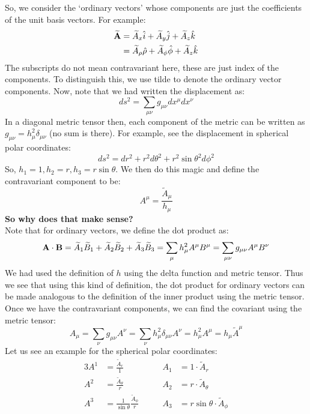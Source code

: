 So, we consider the `ordinary vectors' whose components are just the coefficients of the unit basis vectors. For example:
\begin{align*}
    \widetilde{\boldsymbol{\mathbf{A}}} &= \widetilde{A}_x \hat{i}+\widetilde{A}_y \hat{j}+\widetilde{A}_z \hat{k}\\
    &=\widetilde{A}_\rho \hat{\rho}+\widetilde{A}_\phi \hat{\phi}+\widetilde{A}_z \hat{k}
\end{align*}
The subscripts do not mean contravariant here, these are just index of the components. To distinguish this, we use tilde to denote the ordinary vector components. Now, note that we had written the displacement as:
$$ds^2 = \sum\limits_{\mu\nu} g_{\mu\nu}dx^\mu dx^\nu$$
In a diagonal metric tensor then, each component of the metric can be written as $g_{\mu\nu} = h_\mu^2\delta_{\mu\nu}$ (no sum is there). For example, see the displacement in spherical polar coordinates:
$$ds^2 = dr^2 + r^2 d\theta^2 + r^2\sin\theta^2 d\phi^2$$
So, $h_1 = 1, h_2 = r, h_3 = r\sin\theta$. We then do this magic and define the contravariant component to be:
$$A^\mu = \frac{\widetilde{A}_\mu}{h_\mu}$$
\textbf{So why does that make sense?}\\[0.3cm]
Note that for ordinary vectors, we define the dot product as: 
$$\boldsymbol{\mathbf{A}}\cdot\boldsymbol{\mathbf{B}} = \widetilde{A}_1\widetilde{B}_1+\widetilde{A}_2\widetilde{B}_2+\widetilde{A}_3\widetilde{B}_3 =\sum\limits_\mu h_\mu^2 A^\mu B^\mu = \sum\limits_{\mu\nu} g_{\mu\nu}A^\mu B^\nu$$
We had used the definition of $h$ using the delta function and metric tensor. Thus we see that using this kind of definition, the dot product for ordinary vectors can be made analogous to the definition of the inner product using the metric tensor. Once we have the contravariant components, we can find the covariant using the metric tensor:
$$A_\mu = \sum\limits_\nu g_{\mu\nu}A^\nu = \sum\limits_\nu h^2_\mu \delta_{\mu\nu} A^\nu = h^2_\mu A^\mu = h_\mu \widetilde{A}^\mu$$
Let us see an example for the spherical polar coordinates:
\begin{alignat*}{3}
    A^1   & = \frac{\widetilde{A}_r}{1}        &\quad\quad  A_1   &= 1 \cdot \widetilde{A}_r \\
    A^2   & = \frac{\widetilde{A}_\theta}{r}   &\quad\quad  A_2   &= r \cdot \widetilde{A}_\theta \\
    A^3   & = \frac{1}{\sin\theta} \frac{\widetilde{A}_\phi}{r} &\quad\quad  A_3   &= r\sin\theta \cdot \widetilde{A}_\phi \\
\end{alignat*}
